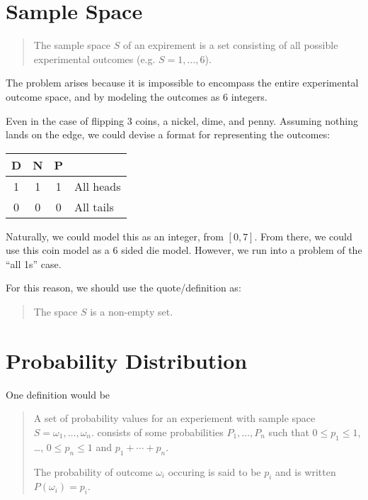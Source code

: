 \documentclass{article}
\begin{document}
\section*{Sample Space}

\begin{quote}
The sample space $S$ of an expirement is a set consisting of all
possible experimental outcomes (e.g. $S = {1, \ldots, 6}$).
\end{quote}

The problem arises because it is impossible to encompass the entire
experimental outcome space, and by modeling the outcomes as 6
integers.

Even in the case of flipping 3 coins, a nickel, dime, and
penny. Assuming nothing lands on the edge, we could devise a format
for representing the outcomes:

\begin{center}
\begin{tabular}{cccl}
D & N & P & \\
\hline
1 & 1 & 1 & All heads \\
0 & 0 & 0 & All tails
\end{tabular}
\end{center}

Naturally, we could model this as an integer, from $[0, 7]$. From
there, we could use this coin model as a 6 sided die model. However,
we run into a problem of the ``all 1s'' case.

For this reason, we should use the quote/definition as:

\begin{quote}
The space $S$ is a non-empty set.
\end{quote}

\section*{Probability Distribution}

One definition would be

\begin{quote}
A set of probability values for an experiement with sample space $S =
{ \omega_1, \ldots, \omega_n }$. consists of some probabilities
$P_1, \ldots, P_n$ such that $0 \le p_1 \le 1$, \ldots, $0 \le p_n \le 1$
and $p_1 + \cdots + p_n$.

The probability of outcome $\omega_i$ occuring is said to be $p_i$ and is
written $P(\omega_i) = p_i$.
\end{quote}
\end{document}
